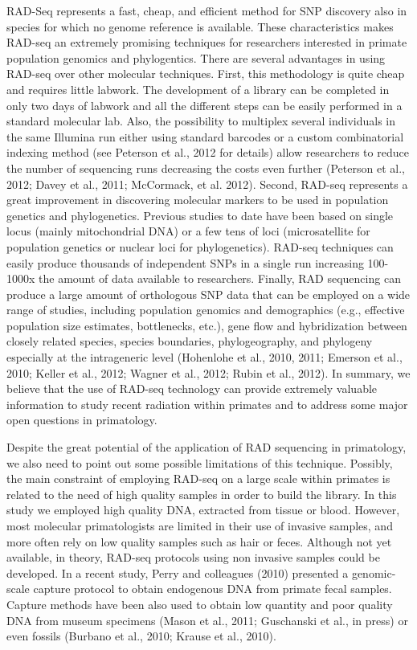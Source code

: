 \documentclass[12pt]{article}
\begin{document}
RAD-Seq represents a fast, cheap, and efficient method for SNP discovery also in species for which no genome reference is available. These characteristics makes RAD-seq an extremely promising techniques for researchers interested in primate population genomics and phylogentics. There are several advantages in using RAD-seq over other molecular techniques. First, this methodology is quite cheap and requires little labwork. The development of a library can be completed in only two days of labwork and all the different steps can be easily performed in a standard molecular lab. Also, the possibility to multiplex several individuals in the same Illumina run either using standard barcodes or a custom combinatorial indexing method (see Peterson et al., 2012 for details) allow researchers to reduce the number of sequencing runs decreasing the costs even further (Peterson et al., 2012; Davey et al., 2011; McCormack, et al. 2012). Second, RAD-seq represents a great improvement in discovering molecular markers to be used in population genetics and phylogenetics. Previous studies to date have been based on single locus (mainly mitochondrial DNA) or a few tens of loci (microsatellite for population genetics or nuclear loci for phylogenetics). RAD-seq techniques can easily produce thousands of independent SNPs in a single run increasing 100-1000x the amount of data available to researchers. Finally, RAD sequencing can produce a large amount of orthologous SNP data that can be employed on a wide range of studies, including population genomics and demographics (e.g., effective population size estimates, bottlenecks, etc.), gene flow and hybridization between closely related species, species boundaries, phylogeography, and phylogeny especially at the intrageneric level (Hohenlohe et al., 2010, 2011; Emerson et al., 2010; Keller et al., 2012; Wagner et al., 2012; Rubin et al., 2012). In summary, we believe that the use of RAD-seq technology can provide extremely valuable information to study recent radiation within primates and to address some major open questions in primatology.

Despite the great potential of the application of RAD sequencing in primatology, we also need to point out some possible limitations of this technique. Possibly, the main constraint of employing RAD-seq on a large scale within primates is related to the need of high quality samples in order to build the library. In this study we employed high quality DNA, extracted from tissue or blood. However, most molecular primatologists are limited in their use of invasive samples, and more often rely on low quality samples such as hair or feces. Although not yet available, in theory, RAD-seq protocols using non invasive samples could be developed. In a recent study, Perry and colleagues (2010) presented a genomic-scale capture protocol to obtain endogenous DNA from primate fecal samples. Capture methods have been also used to obtain low quantity and poor quality DNA from museum specimens (Mason et al., 2011; Guschanski et al., in press) or even fossils (Burbano et al., 2010; Krause et al., 2010).
\end{document}
